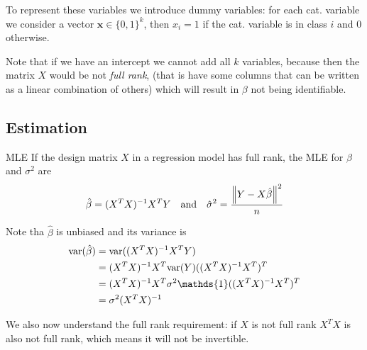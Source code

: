 \documentclass[12pt]{extarticle}
\renewcommand{\var}{{\operatorfont var}}
\renewcommand{\vec}[1]{\bm{#1}}
\begin{document}
To represent these variables we introduce dummy variables:
for each cat. variable we consider a vector $\vec x \in \{ 0, 1\}^k$,
then $x_i = 1$ if the cat. variable is in class $i$ and $0$ otherwise.

Note that if we have an intercept we cannot add all $k$ variables, because then the matrix $X$
would be not \emph{full rank},
(that is have some columns that can be written as a linear combination of others)
which will result in $\beta$ not being identifiable.

\subsection{Estimation}

\begin{theorem}{MLE}{}
    If the design matrix $X$ in a regression model has full rank, the MLE for $\beta$ and $\sigma^2$ are
    \begin{equation}
        \hat \beta = (X^T X)^{-1} X^T Y \quad \text{and} \quad \hat \sigma^2 = \frac{\norm{Y - X \hat \beta}^2}{n}
    \end{equation}
\end{theorem}

Note tha $\hat \beta$ is unbiased and its variance is
\begin{align}
    \var(\hat \beta ) & = \var((X^T X)^{-1} X^T Y)                                 \\
                      & = (X^T X)^{-1}X^T \var(Y) ((X^T X)^{-1} X^T)^T             \\
                      & = (X^T X)^{-1}X^T \sigma^2 \mathds{1} ((X^T X)^{-1} X^T)^T \\
                      & = \sigma^2 (X^T X)^{-1}
\end{align}

We also now understand the full rank requirement: if $X$ is not full rank $X^T X$ is also not full rank,
which means it will not be invertible.
\end{document}
